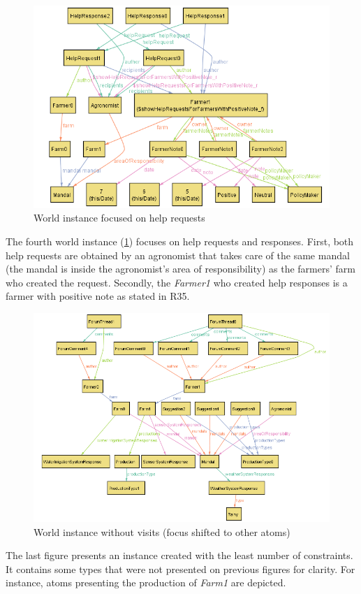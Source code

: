 \begin{figure}[H]
    \centering
    \includegraphics[width=\textwidth, keepaspectratio, origin=c]{alloy/world_instances/showHelpRequestsForFarmersWithPositiveNote2.png}
    \caption{World instance focused on help requests}
    \label{fig:help_requests}
\end{figure}
The fourth world instance (\ref{fig:help_requests}) focuses on help requests and responses. First, both help requests are obtained by an agronomist that takes care of the same mandal (the mandal is inside the agronomist's area of responsibility) as the farmers' farm who created the request. Secondly, the \textit{Farmer1} who created help responses is a farmer with positive note as stated in R35.


\begin{figure}[H]
    \centering
    \includegraphics[width=\textwidth, keepaspectratio, origin=c]{alloy/world_instances/General2.png}
    \caption{World instance without visits (focus shifted to other atoms)}
    \label{fig:general_world}
\end{figure}
The last figure presents an instance created with the least number of constraints. It contains some types that were not presented on previous figures for clarity. For instance, atoms presenting the production of \textit{Farm1} are depicted.